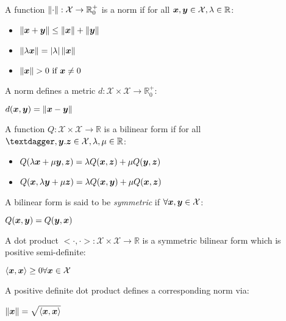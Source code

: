 \begin{definition}[Norm]
A function $\left\lVert\cdot\right\rVert:\mathcal{X}\rightarrow\mathbb{R}^+_0$ is a norm if for all $\bm{x}, \bm{y}\in\mathcal{X}, \lambda\in\mathbb{R}$:
\begin{itemize}
	\item $\left\lVert\bm{x}+\bm{y}\right\rVert\leq\left\lVert\bm{x}\right\rVert+\left\lVert\bm{y}\right\rVert$
	\item $\left\lVert\lambda\bm{x}\right\rVert=\vert \lambda \vert\left\lVert\bm{x}\right\rVert$
	\item $\left\lVert\bm{x}\right\rVert>0~\text{if}~\bm{x}\neq0$
\end{itemize}
\end{definition}
A norm defines a metric $d:\mathcal{X}\times\mathcal{X}\rightarrow\mathbb{R}^+_0$:
\begin{center}
	$\displaystyle d(\bm{x},\bm{y})=\left\lVert\bm{x}-\bm{y}\right\rVert$
\end{center}
\begin{definition}
A function $Q:\mathcal{X}\times\mathcal{X}\rightarrow\mathbb{R}$ is a bilinear form if for all $\vect{†},\vect{y}.\vect{z}\in\mathcal{X},\lambda,\mu\in\mathbb{R}$:
\begin{itemize}
	\item $Q(\lambda\bm{x}+\mu\bm{y},\bm{z})=\lambda Q(\bm{x}, \bm{z})+\mu Q(\bm{y},\bm{z})$
	\item $Q(\bm{x},\lambda\bm{y}+\mu\bm{z})=\lambda Q(\bm{x}, \bm{y})+\mu Q(\bm{x},\bm{z})$
\end{itemize}
\end{definition}
\begin{definition}
A bilinear form is said to be \textit{symmetric} if $\forall\bm{x},\bm{y}\in\mathcal{X}$:
\begin{center}
	$\displaystyle Q(\bm{x},\bm{y})=Q(\bm{y}, \bm{x})$
\end{center}	
\end{definition}
\begin{definition}
A dot product $<\cdot,\cdot>:\mathcal{X}\times\mathcal{X}\rightarrow\mathbb{R}$ is a symmetric bilinear form which is positive semi-definite:
\begin{center}
	$\displaystyle \left\langle\bm{x}, \bm{x}\right\rangle\geq 0\forall\bm{x}\in\mathcal{X}$
\end{center}
\end{definition}
A positive definite dot product defines a corresponding norm via:
\begin{center}
	$\displaystyle \left\lVert\bm{x}\right\rVert=\sqrt{\left\langle\bm{x}, \bm{x}\right\rangle}$
\end{center}

